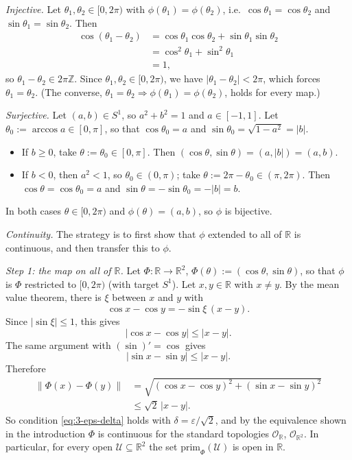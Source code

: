 \documentclass[11pt]{article}
\newcommand{\prim}[1]{\mathrm{prim}_{#1}}
\begin{document}
\emph{Injective.} Let $\theta_1,\theta_2\in[0,2\pi)$ with $\phi(\theta_1)=\phi(\theta_2)$, i.e.\ $\cos\theta_1=\cos\theta_2$ and $\sin\theta_1=\sin\theta_2$. Then
\begin{align*}
\cos(\theta_1-\theta_2)
&=\cos\theta_1\cos\theta_2+\sin\theta_1\sin\theta_2\\
&=\cos^2\theta_1+\sin^2\theta_1\\
&=1,
\end{align*}
so $\theta_1-\theta_2\in2\pi\mathbb Z$. Since $\theta_1,\theta_2\in[0,2\pi)$, we have $|\theta_1-\theta_2|<2\pi$, which forces $\theta_1=\theta_2$. (The converse, $\theta_1=\theta_2\Rightarrow\phi(\theta_1)=\phi(\theta_2)$, holds for every map.)

\emph{Surjective.} Let $(a,b)\in S^1$, so $a^2+b^2=1$ and $a\in[-1,1]$. Let $\theta_0:=\arccos a\in[0,\pi]$, so that $\cos\theta_0=a$ and $\sin\theta_0=\sqrt{1-a^2}=|b|$.
\begin{itemize}
  \item If $b\ge0$, take $\theta:=\theta_0\in[0,\pi]$. Then $(\cos\theta,\sin\theta)=(a,|b|)=(a,b)$.
  \item If $b<0$, then $a^2<1$, so $\theta_0\in(0,\pi)$; take $\theta:=2\pi-\theta_0\in(\pi,2\pi)$. Then $\cos\theta=\cos\theta_0=a$ and $\sin\theta=-\sin\theta_0=-|b|=b$.
\end{itemize}
In both cases $\theta\in[0,2\pi)$ and $\phi(\theta)=(a,b)$, so $\phi$ is bijective.

\emph{Continuity.} The strategy is to first show that $\phi$ extended to all of $\mathbb R$ is continuous, and then transfer this to $\phi$.

\emph{Step 1: the map on all of $\mathbb R$.} Let $\Phi:\mathbb R\to\mathbb R^2$, $\Phi(\theta):=(\cos\theta,\sin\theta)$, so that $\phi$ is $\Phi$ restricted to $[0,2\pi)$ (with target $S^1$). Let $x,y\in\mathbb R$ with $x\neq y$. By the mean value theorem, there is $\xi$ between $x$ and $y$ with
\[
\cos x-\cos y=-\sin\xi\,(x-y).
\]
Since $|\sin\xi|\le1$, this gives
\[
|\cos x-\cos y|\le|x-y|.
\]
The same argument with $(\sin)'=\cos$ gives
\[
|\sin x-\sin y|\le|x-y|.
\]
Therefore
\begin{align*}
\lVert\Phi(x)-\Phi(y)\rVert
&=\sqrt{(\cos x-\cos y)^2+(\sin x-\sin y)^2}\\
&\le\sqrt2\,|x-y|.
\end{align*}
So condition \eqref{eq:3-eps-delta} holds with $\delta=\varepsilon/\sqrt2$, and by the equivalence shown in the introduction $\Phi$ is continuous for the standard topologies $\mathcal O_{\mathbb R}$, $\mathcal O_{\mathbb R^2}$. In particular, for every open $\mathcal U\subseteq\mathbb R^2$ the set $\prim{\Phi}(\mathcal U)$ is open in $\mathbb R$.
\end{document}
